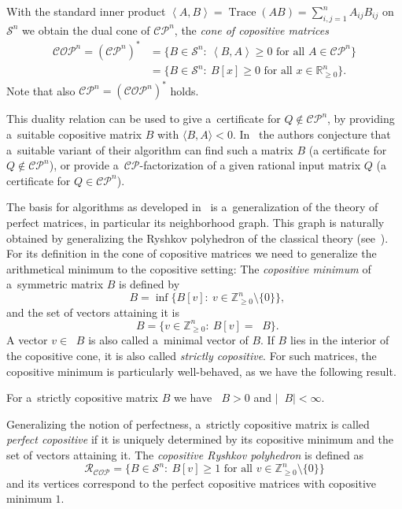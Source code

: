 \documentclass{commat}
\newcommand{\IZ}{{\mathbb{Z}}}
\newcommand{\IR}{{\mathbb{R}}}
\newcommand{\sR}{\mathcal{R}}
\newcommand{\sn}{{\mathcal{S}}^{n}}
\newcommand{\IZngeo}{\IZ_{\geq0}^n}
\newcommand{\IZngeomo}{\IZngeo\setminus\{0\}}
\newcommand{\IRngeo}{\IR_{\geq0}^n}
\newcommand{\cop}{{\mathcal{COP}}}
\newcommand{\copn}{{\mathcal{COP}}^{n}}
\newcommand{\cp}{{\mathcal{CP}}}
\newcommand{\cpn}{{\mathcal{CP}}^{n}}
\DeclareMathOperator{\minC}{min_{\cop}}
\DeclareMathOperator{\MinC}{Min_{\cop}}
\begin{document}
With the standard inner product
\(\left< A, B \right> = \operatorname{Trace}(AB) = \sum_{i,j=1}^n A_{ij}B_{ij} \)
on \(\sn \) we obtain the dual cone of \(\cpn \), the \emph{cone of copositive matrices}
\begin{align*}
	\copn = {(\cpn)}^*
		& = \big\{ B\in\sn :\ \left< B,A \right>\geq0 \text{ for all } A\in\cpn \big\} \\
		& = \big\{ B\in\sn :\ B[x]\geq0 \text{ for all } x\in\IRngeo \big\}.
\end{align*}
Note that also \(\cpn={(\copn)}^* \) holds.

This duality relation can be used to give a~certificate for \(Q\notin\cpn \),
by providing a~suitable copositive matrix $B$ with \(\langle B,A\rangle<0 \).
In~\cite{dsv-2021} the authors conjecture that a~suitable variant of their algorithm can find such
a matrix $B$ (a certificate for \(Q\not\in\cpn \)), or provide a~\(\cp \)-factorization of
a given rational input matrix $Q$ (a certificate for \(Q\in\cpn \)).

The basis for algorithms as developed in~\cite{dsv-2021} is a~generalization of the theory of
perfect matrices, in particular its neighborhood graph.
This graph is naturally obtained by generalizing the Ryshkov polyhedron of the classical
theory (see~\cite{schuermann-2009}).
For its definition in the cone of copositive matrices we need to generalize the arithmetical
minimum to the copositive setting:
The \emph{copositive minimum} of a~symmetric matrix $B$ is defined by
\[
	\minC B = \inf\big\{ B[v] :\ v\in\IZngeomo \big\},
\]
and the set of vectors attaining it is
\[
	\MinC B = \big\{ v\in\IZngeo :\ B[v]=\minC B \big\}.
\]
A vector \(v\in\MinC B \) is also called a~minimal vector of $B$.
If $B$ lies in the interior of the copositive cone, it is also called \emph{strictly copositive}.
For such matrices, the copositive minimum is particularly well-behaved,
as we have the following result.
\begin{lemma} For a~strictly copositive matrix $B$ we have \(\minC B>0 \) and \(|\MinC B|<\infty \).
\end{lemma}
Generalizing the notion of perfectness, a~strictly copositive matrix is called
\emph{perfect copositive} if it is uniquely determined by its copositive minimum and the set of
vectors attaining it.
The \emph{copositive Ryshkov polyhedron} is defined as
\[
	\sR_\cop = \big\{ B\in\sn :\ B[v]\geq1 \text{ for all } v\in\IZngeomo \big\}
\]
and its vertices correspond to the perfect copositive matrices with copositive minimum $1$.
\end{document}
